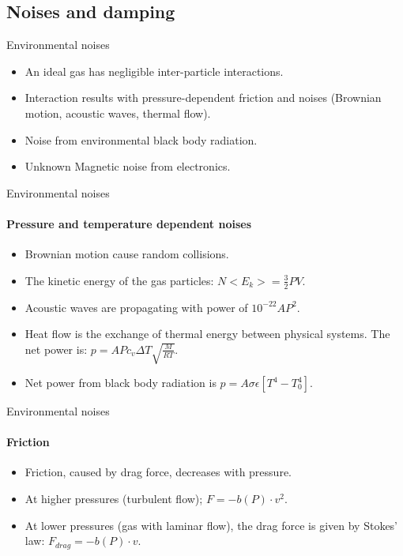 \documentclass{beamer}
\begin{document}
\subsection{Noises and damping}
\begin{frame}{Environmental noises}
	\begin{itemize}
		\item An ideal gas has negligible inter-particle interactions.
		\item Interaction results with pressure-dependent friction and noises (Brownian motion, acoustic waves, thermal flow).  
		\item Noise from environmental black body radiation.
		\item Unknown Magnetic noise from electronics.
			
	\end{itemize}
\end{frame}
\begin{frame}{Environmental noises}
	\framesubtitle{Pressure and temperature dependent noises}
	\begin{itemize}
		
		\item Brownian motion cause random collisions. 
		\item The kinetic energy of the gas particles: $ N<E_k> = \frac{3}{2} PV$.
		\item Acoustic waves are propagating with power of $10^{-22}AP^2$.
		\item Heat flow is the exchange of thermal energy between physical systems. The net power is: $p= A P c_v \Delta T \sqrt{\frac{M}{RT}} $.
		\pause
		\item Net power from black body radiation is $p= A \sigma\epsilon[ T^4- T_0^4]$.
		
	\end{itemize}
\end{frame}
\begin{frame}{Environmental noises}
	\framesubtitle{Friction}
	\begin{itemize}
		\item Friction, caused by drag force, decreases with pressure.		
		\pause
		\item At higher pressures (turbulent flow); $F = -b(P)\cdot v^2 $.
		\item At lower pressures (gas with laminar flow), the drag force is given by Stokes' law: $F_{drag} =  -b(P)\cdot v$.	
		
	\end{itemize}
\end{frame}
\end{document}
